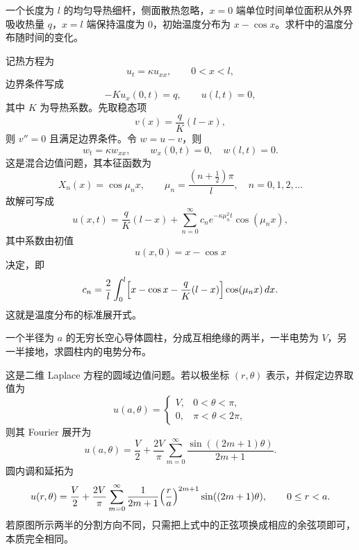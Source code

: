 \begin{question}[导热细杆]

一个长度为 $l$ 的均匀导热细杆，侧面散热忽略，$x=0$ 端单位时间单位面积从外界吸收热量 $q$，$x=l$ 端保持温度为 $0$，初始温度分布为 $x-\cos x$。求杆中的温度分布随时间的变化。

\begin{solution}

记热方程为
\[
 u_t=\kappa u_{xx},\qquad 0<x<l,
\]
边界条件写成
\[
 -K u_x(0,t)=q,\qquad u(l,t)=0,
\]
其中 $K$ 为导热系数。先取稳态项
\[
 v(x)=\frac{q}{K}(l-x),
\]
则 $v''=0$ 且满足边界条件。令 $w=u-v$，则
\[
 w_t=\kappa w_{xx},\qquad w_x(0,t)=0,\quad w(l,t)=0.
\]
这是混合边值问题，其本征函数为
\[
 X_n(x)=\cos\mu_n x,
\qquad \mu_n=\frac{(n+\tfrac12)\pi}{l},\quad n=0,1,2,\dots
\]
故解可写成
\[
 u(x,t)=\frac{q}{K}(l-x)+\sum_{n=0}^{\infty}c_n e^{-\kappa\mu_n^2 t}\cos(\mu_n x),
\]
其中系数由初值
\[
 u(x,0)=x-\cos x
\]
决定，即
\[
 c_n=\frac{2}{l}\int_0^l\Bigl[x-\cos x-\frac{q}{K}(l-x)\Bigr]\cos(\mu_n x)\,dx.
\]
这就是温度分布的标准展开式。


\end{solution}
\end{question}

\begin{question}[空心导体圆柱的电势]

一个半径为 $a$ 的无穷长空心导体圆柱，分成互相绝缘的两半，一半电势为 $V$，另一半接地，求圆柱内的电势分布。

\begin{solution}

这是二维 Laplace 方程的圆域边值问题。若以极坐标 $(r,\theta)$ 表示，并假定边界取值为
\[
 u(a,\theta)=
 \begin{cases}
 V,&0<\theta<\pi,\\
 0,&\pi<\theta<2\pi,
 \end{cases}
\]
则其 Fourier 展开为
\[
 u(a,\theta)=\frac{V}{2}+\frac{2V}{\pi}\sum_{m=0}^{\infty}
 \frac{\sin( (2m+1)\theta)}{2m+1}.
\]
圆内调和延拓为
\[
 u(r,\theta)=\frac{V}{2}+\frac{2V}{\pi}\sum_{m=0}^{\infty}
 \frac{1}{2m+1}\Bigl(\frac{r}{a}\Bigr)^{2m+1}\sin((2m+1)\theta),
 \qquad 0\le r<a.
\]
若原图所示两半的分割方向不同，只需把上式中的正弦项换成相应的余弦项即可，本质完全相同。


\end{solution}
\end{question}

\clearpage

